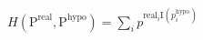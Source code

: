 \documentclass[preview]{standalone}
\begin{document}
\begin{align*}
H(\text{P}^{\text{real}},\text{P}^{\text{hypo}}) = \sum_i p^{\text{real}_i\mathrm{I}(p_i^{\text{hypo}})}
\end{align*}
\end{document}

